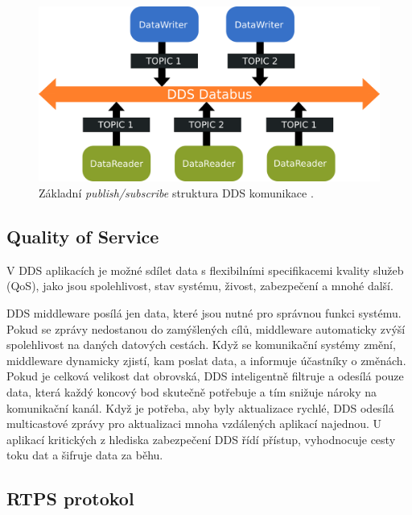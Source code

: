 \begin{figure}[!ht]
  \begin{center}
    \includegraphics[scale=0.35]{obrazky/DDS2}
  \end{center}
  \caption[Základní \textit{publish/subscribe} struktura \acs{DDS} komunikace]{Základní \textit{publish/subscribe} struktura \acs{DDS} komunikace \cite{DDS_PubSub}.}
  \label{fig:DDSarch}
\end{figure}

\subsection{Quality of Service}

V \acs{DDS} aplikacích je možné sdílet data s flexibilními specifikacemi kvality služeb (\acs{QoS}), jako jsou spolehlivost, stav systému, živost, zabezpečení a mnohé další. 

\acs{DDS} middleware posílá jen data, které jsou nutné pro správnou funkci systému. Pokud se zprávy nedostanou do zamýšlených cílů, middleware automaticky zvýší spolehlivost na daných datových cestách. Když se komunikační systémy změní, middleware dynamicky zjistí, kam poslat data, a informuje účastníky o změnách. Pokud je celková velikost dat obrovská, \acs{DDS} inteligentně filtruje a odesílá pouze data, která každý koncový bod skutečně potřebuje a tím snižuje nároky na komunikační kanál. Když je potřeba, aby byly aktualizace rychlé, \acs{DDS} odesílá multicastové zprávy pro aktualizaci mnoha vzdálených aplikací najednou. U aplikací kritických z hlediska zabezpečení \acs{DDS} řídí přístup, vyhodnocuje cesty toku dat a šifruje data za běhu. \cite{DDS_Main}

\subsection{\acs{RTPS} protokol}

